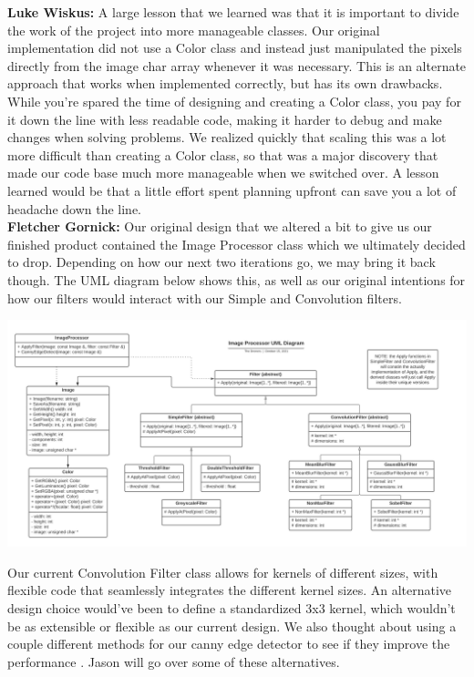\textbf{Luke Wiskus:}
A large lesson that we learned was that it is important to divide the work of the project into more manageable classes. Our original implementation did not use a Color class and instead just manipulated the pixels directly from the image char array whenever it was necessary. This is an alternate approach that works when implemented correctly, but has its own drawbacks. \\ 

While you're spared the time of designing and creating a Color class, you pay for it down the line with less readable code, making it harder to debug and make changes when solving problems. We realized quickly that scaling this was a lot more difficult than creating a Color class, so that was a major discovery that made our code base much more manageable when we switched over. A lesson learned would be that a little effort spent planning upfront can save you a lot of headache down the line. \\
	
\textbf{Fletcher Gornick:}
Our original design that we altered a bit to give us our finished product contained the Image Processor class which we ultimately decided to drop.  Depending on how our next two iterations go, we may bring it back though. The UML diagram below shows this, as well as our original intentions for how our filters would interact with our Simple and Convolution filters.

\includegraphics[width=\textwidth]{original.png}

Our current Convolution Filter class allows for kernels of different sizes, with flexible code that seamlessly integrates the different kernel sizes. An alternative design choice would've been to define a standardized 3x3 kernel, which wouldn't be as extensible or flexible as our current design. We also thought about using a couple different methods for our canny edge detector to see if they improve the performance \cite{canny}. Jason will go over some of these alternatives. \\

